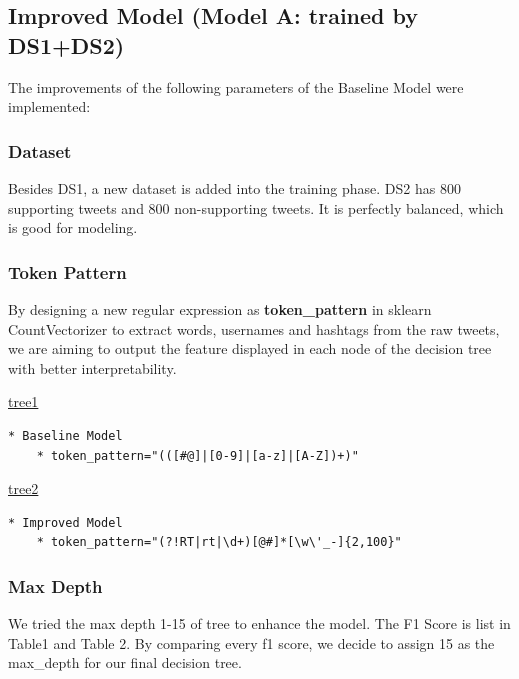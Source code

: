 \documentclass{article} %
\begin{document}
\subsection{Improved Model (Model A: trained by DS1+DS2)}

The improvements of the following parameters of the Baseline Model were implemented:



\subsubsection{Dataset}

Besides DS1, a new dataset is added into the training phase. DS2 has 800 supporting tweets and 800 non-supporting tweets. It is perfectly balanced, which is good for modeling.


\subsubsection{Token Pattern}

By designing a new regular expression as \textbf{token\_pattern} in sklearn CountVectorizer to extract words, usernames and hashtags from the raw tweets, we are aiming to output the feature displayed in each node of the decision tree with better interpretability.

\hyperref[token:tuple]{tree1}
\lstset{language=Python}
\lstset{frame=lines}
\lstset{basicstyle=\footnotesize}
\begin{lstlisting}
* Baseline Model
	* token_pattern="(([#@]|[0-9]|[a-z]|[A-Z])+)" 
\end{lstlisting}

\hyperref[token:word]{tree2}
\lstset{language=Python}
\lstset{frame=lines}
\lstset{basicstyle=\footnotesize}
\begin{lstlisting}	
* Improved Model
	* token_pattern="(?!RT|rt|\d+)[@#]*[\w\'_-]{2,100}"
\end{lstlisting}




\subsubsection{Max Depth}

We tried the max depth 1-15 of tree to enhance the model. The F1 Score is list in Table1 and Table 2. By comparing every f1 score, we decide to assign 15 as the max\_depth for our final decision tree.
\end{document}
